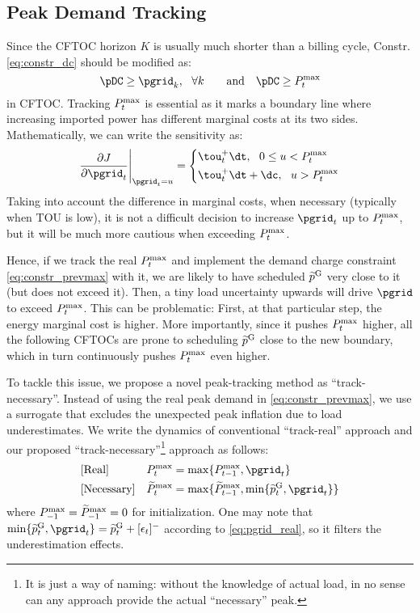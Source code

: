 \subsection{Peak Demand Tracking}\label{sec: method_peak_track}
Since the CFTOC horizon $K$ is usually much shorter than a billing cycle, Constr.\,\eqref{eq:constr_dc} should be modified as:
\begin{equation}\label{eq:constr_prevmax}
    \pDC \ge \pgrid_k, ~~\forall k \quad\quad\text{and}\quad
    \pDC \ge \prevmax_t
\end{equation}
in CFTOC. Tracking $P^{\max}_t$ is essential as it marks a boundary line where increasing imported power has different marginal costs at its two sides. Mathematically, we can write the sensitivity as:
\begin{equation}
    \frac{\partial J}{\partial \pgrid_t}\Bigg\vert_{\pgrid_t = u} =
    \left\{\begin{aligned}
    & \tou^+_t \dt, ~~ 0 \le u < \prevmax_t\\
    & \tou^+_t \dt + \dc, ~~ u > \prevmax_t
    \end{aligned}
    \right.
\end{equation}
Taking into account the difference in marginal costs, when necessary (typically when TOU is low), it is not a difficult decision to increase $\pgrid_t$ up to $P^{\max}_t$, but it will be much more cautious when exceeding $P^{\max}_t$.

Hence, if we track the real $P^{\max}_t$ and implement the demand charge constraint \eqref{eq:constr_prevmax} with it, we are likely to have scheduled $\widetilde{p}^{\text{G}}$ very close to it (but does not exceed it). Then, a tiny load uncertainty upwards will drive $\pgrid$ to exceed $P^{\max}_t$. This can be problematic: First, at that particular step, the energy marginal cost is higher. More importantly, since it pushes $P^{\max}_t$ higher, all the following CFTOCs are prone to scheduling $\widetilde{p}^{\text{G}}$ close to the new boundary, which in turn continuously pushes $P^{\max}_t$ even higher.

To tackle this issue, we propose a novel peak-tracking method as ``track-necessary''. Instead of using the real peak demand in \eqref{eq:constr_prevmax}, we use a surrogate that excludes the unexpected peak inflation due to load underestimates. We write the dynamics of conventional ``track-real'' approach and our proposed ``track-necessary''\footnote{It is just a way of naming: without the knowledge of actual load, in no sense can any approach provide the actual ``necessary'' peak.} approach as follows:
\begin{subequations}
\begin{align}
    & [\text{Real}] && \prevmax_t = \max\{\prevmax_{t-1}, \pgrid_t\}\label{eq: pmax_actual}\\
    & [\text{Necessary}] && \prevmaxNecc_t = \max\{\prevmaxNecc_{t-1}, \min\{\pgridSch_t, \pgrid_t\}\}\label{eq: pmax_necessary}
\end{align}
\end{subequations}
where $P^{\max}_{-1} = \widetilde{P}^{\max}_{-1} = 0$ for initialization. One may note that $\min\{\pgridSch_t, \pgrid_t\} = \pgridSch_t + [\epsilon_t]^-$ according to \eqref{eq:pgrid_real}, so it filters the underestimation effects.